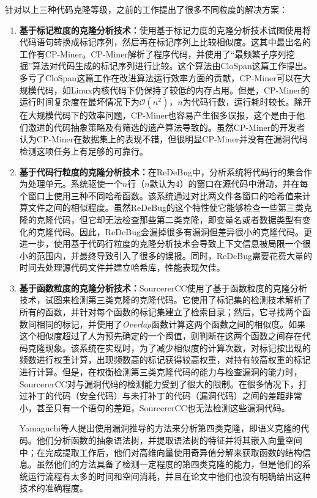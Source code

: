 针对以上三种代码克隆等级，之前的工作提出了很多不同粒度的解决方案：
\begin{enumerate}
  \item \textbf{基于标记粒度的克隆分析技术：}使用基于标记力度的克隆分析技术试图使用将代码语句转换成标记序列，然后再在标记序列上比较相似度。这其中最出名的工作有CP-Miner\cite{cpminer}。CP-Miner解析了程序代码，并使用了“最频繁子序列挖掘”算法对代码生成的标记序列进行比较。这个算法由CloSpan\cite{clospan}这篇工作提出。多亏了CloSpan这篇工作在改进算法运行效率方面的贡献，CP-Miner可以在大规模代码，如Linux内核代码下仍保持了较低的内存占用。但是，CP-Miner的运行时间复杂度在最坏情况下为$\mathcal{O}(n^{2})$，$n$为代码行数，运行耗时较长。除开在大规模代码下的效率问题，CP-Miner也容易产生很多误报，这个是由于他们激进的代码抽象策略及有筛选的遗产算法导致的。虽然CP-Miner的开发者认为CP-Miner在数据集上的表现不错，但很明显CP-Miner并没有在漏洞代码检测这项任务上有足够的可靠行。
  \item \textbf{基于代码行粒度的克隆分析技术：}在ReDeBug\cite{redebug}中，分析系统将代码行的集合作为处理单元。系统驱使一个$n$行（$n$默认为4）的窗口在源代码中滑动，并在每个窗口上使用三种不同哈希函数。该系统通过对比两文件各窗口的哈希值来计算文件之间的相似程度。虽然ReDeBug的这个特性使它能够检查一些第三类克隆的克隆代码，但它却无法检查那些第二类克隆，即变量名或者数据类型有变化的克隆代码。因此，ReDeBug会漏掉很多有漏洞但差异很小的克隆代码。更进一步，使用基于代码行粒度的克隆分析技术会导致上下文信息被局限一个很小的范围内，并最终导致引入了很多的误报。同时，ReDeBug需要花费大量的时间去处理源代码文件并建立哈希库，性能表现欠佳。
  \item \textbf{基于函数粒度的克隆分析技术：}SourcererCC\cite{sourcerercc}使用了基于函数粒度的克隆分析技术，试图来检测第三类克隆的克隆代码。它使用了标记集的检测技术解析了所有的函数，并针对每个函数的标记集建立了检索目录；然后，它寻找两个函数间相同的标记，并使用了\emph{Overlap}函数计算这两个函数之间的相似度。如果这个相似度超过了人为预先确定的一个阈值，则判断在这两个函数之间存在代码克隆现象。该系统在实现时，为了减少相似度的计算次数，对标记按出现的频数进行权重计算，出现频数高的标记获得较高权重，对持有较高权重的标记进行计算。但是，在权衡检测第三类克隆代码的能力与检查漏洞的能力时，SourcererCC对与漏洞代码的检测能力受到了很大的限制。在很多情况下，打过补丁的代码（安全代码）与未打补丁的代码（漏洞代码）之间的差距非常小，甚至只有一个语句的差距，SourcererCC也无法检测这些漏洞代码。

      Yamaguchi等人提出使用漏洞推导的方法\cite{vul-extrapolation}来分析第四类克隆，即语义克隆的代码。他们分析函数的抽象语法树，并提取语法树的特征并将其嵌入向量空间中；在完成提取工作后，他们对高维向量使用奇异值分解来获取函数的结构信息。虽然他们的方法具备了检测一定程度的第四类克隆的能力，但是他们的系统运行流程有太多的时间和空间消耗，并且在论文中他们也没有明确给出这种技术的准确程度。


\end{enumerate}
